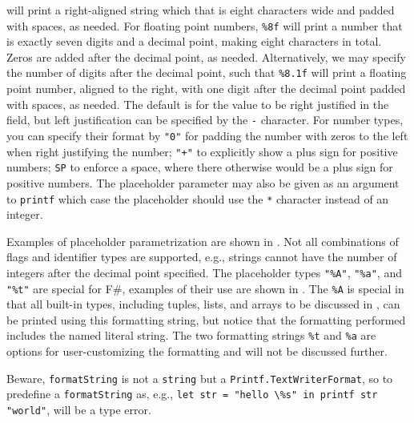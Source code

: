 will print a right-aligned string which that is eight characters wide and padded with spaces, as needed. For floating point numbers, \lstinline{%8f} %
will print a number that is exactly seven digits and a decimal point, making eight characters in total. Zeros are added after the decimal point, as needed. Alternatively, we may specify the number of digits after the decimal point, such that \lstinline{%8.1f} %
will print a floating point number, aligned to the right, with one digit after the decimal point padded with spaces, as needed. The default is for the value to be right justified in the field, but left justification can be specified by the \lstinline!-! character. For number types, you can specify their format by \lstinline!"0"! for padding the number with zeros to the left when right justifying the number; \lstinline!"+"! to explicitly show a plus sign for positive numbers; \lstinline!SP! to enforce a space, where there otherwise would be a plus sign for positive numbers. The placeholder parameter may also be given as an argument to \lstinline{printf} which case the placeholder should use the \lstinline!*! character instead of an integer.

Examples of placeholder parametrization are shown in .
%
%
Not all combinations of flags and identifier types are supported, e.g., strings cannot have the number of integers after the decimal point specified.
The placeholder types \lstinline{"%A"}, %
\lstinline{"%a"}, %
and \lstinline{"%t"} %
are special for F\#, examples of their use are shown in .
%
%
The \lstinline!%A! %
is special in that all built-in types, including tuples, lists, and arrays to be discussed in , can be printed using this formatting string, but notice that the formatting performed includes the named literal string. The two formatting strings \lstinline!%t! %
and \lstinline!%a! %
are options for user-customizing the formatting and will not be discussed further.

Beware, \lstinline[language=ebnf]!formatString! is not a \lstinline!string! but a \lstinline!Printf.TextWriterFormat!, so to predefine a \lstinline[language=ebnf]!formatString! as, e.g., \mbox{\lstinline{let str = "hello \%s" in printf str "world"}}, will be a type error.

